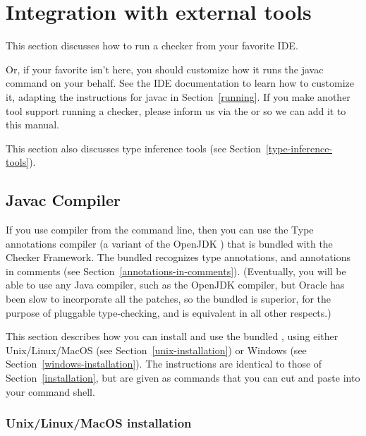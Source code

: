 \htmlhr
\chapter{Integration with external tools\label{external-tools}}

This section discusses how to run a checker from your favorite IDE\@.

Or, if your favorite isn't here, you should customize how it runs the
javac command on your behalf.  See the IDE documentation to learn how to
customize it, adapting the instructions for javac in Section~\ref{running}.
If you make another tool support running a checker, please
inform us via the
 or
 so
we can add it to this manual.

This section also discusses type inference tools (see
Section~\ref{type-inference-tools}).

\section{Javac Compiler\label{javac-installation}}

If you use  compiler from the command line, then you can use
the Type annotations compiler (a variant of the OpenJDK ) that
is bundled with the Checker Framework.  The bundled  recognizes
type annotations, and annotations in comments (see
Section~\ref{annotations-in-comments}).  (Eventually, you will be able to
use any Java compiler, such as the OpenJDK compiler, but Oracle has been
slow to incorporate all the patches, so the bundled  is
superior, for the purpose of pluggable type-checking, and is equivalent in
all other respects.)

This section describes how you can install and use the bundled
, using either Unix/Linux/MacOS (see
Section~\ref{unix-installation}) or Windows (see
Section~\ref{windows-installation}).
The instructions are identical to those of Section~\ref{installation},
but are given as commands that you can cut and paste into your command shell.



\subsection{Unix/Linux/MacOS installation\label{unix-installation}}

